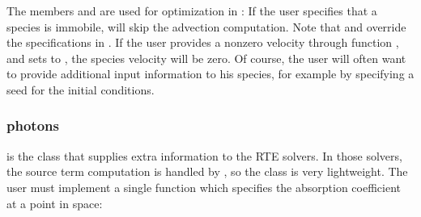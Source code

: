 \documentclass[letterpaper,10pt,english]{sphinxmanual}
\begin{document}
\begin{sphinxVerbatim}[commandchars=\\\{\},formatcom=\scriptsize]
     
   
         
       
       
       


          
      
\end{sphinxVerbatim}

The members  and  are used for optimization in : If the user specifies that a species is immobile,  will skip the advection computation. Note that  and  override the specifications in {\hyperref[\detokenize{MinimalPlasmaModel:chap-cdr-plasma-physics}]{}}. If the user provides a non\sphinxhyphen{}zero velocity through {\hyperref[\detokenize{MinimalPlasmaModel:chap-cdr-plasma-physics}]{}} function , and sets  to , the species velocity will be zero. Of course, the user will often want to provide additional input information to his species, for example by specifying a seed for the initial conditions.


\subsubsection{photons}
\label{\detokenize{MinimalPlasmaModel:photons}}\label{\detokenize{MinimalPlasmaModel:chap-photon}}
{\hyperref[\detokenize{MinimalPlasmaModel:chap-photon}]{}} is the class that supplies extra information to the RTE solvers. In those solvers, the source term computation is handled by {\hyperref[\detokenize{MinimalPlasmaModel:chap-cdr-plasma-physics}]{}}, so the {\hyperref[\detokenize{MinimalPlasmaModel:chap-photon}]{}} class is very lightweight. The user must implement a single function which specifies the absorption coefficient at a point in space:
\end{document}
